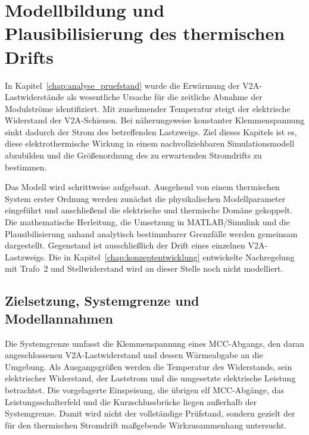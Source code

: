 \section{Modellbildung und Plausibilisierung des thermischen Drifts}
\label{chap:modellbildung}

In Kapitel~\ref{chap:analyse_pruefstand} wurde die Erwärmung der
V2A-Lastwiderstände als wesentliche Ursache für die zeitliche Abnahme der
Modulströme identifiziert. Mit zunehmender Temperatur steigt der elektrische
Widerstand der V2A-Schienen. Bei näherungsweise konstanter Klemmenspannung
sinkt dadurch der Strom des betreffenden Lastzweigs. Ziel dieses Kapitels ist
es, diese elektrothermische Wirkung in einem nachvollziehbaren Simulationsmodell
abzubilden und die Größenordnung des zu erwartenden Stromdrifts zu bestimmen.

Das Modell wird schrittweise aufgebaut. Ausgehend von einem thermischen
System erster Ordnung werden zunächst die physikalischen Modellparameter
eingeführt und anschließend die elektrische und thermische Domäne gekoppelt.
Die mathematische Herleitung, die Umsetzung in MATLAB/Simulink und die
Plausibilisierung anhand analytisch bestimmbarer Grenzfälle werden gemeinsam
dargestellt. Gegenstand ist ausschließlich der Drift eines einzelnen
V2A-Lastzweigs. Die in Kapitel~\ref{chap:konzeptentwicklung} entwickelte
Nachregelung mit Trafo~2 und Stellwiderstand wird an dieser Stelle noch nicht
modelliert.


\subsection{Zielsetzung, Systemgrenze und Modellannahmen}
\label{sec:zielsetzung_systemgrenze_modellannahmen}

Die Systemgrenze umfasst die Klemmenspannung eines MCC-Abgangs, den daran
angeschlossenen V2A-Lastwiderstand und dessen Wärmeabgabe an die Umgebung. Als
Ausgangsgrößen werden die Temperatur des Widerstands, sein elektrischer
Widerstand, der Laststrom und die umgesetzte elektrische Leistung betrachtet.
Die vorgelagerte Einspeisung, die übrigen elf MCC-Abgänge, das
Leistungsschalterfeld und die Kurzschlussbrücke liegen außerhalb der
Systemgrenze. Damit wird nicht der vollständige Prüfstand, sondern gezielt der
für den thermischen Stromdrift maßgebende Wirkzusammenhang untersucht.

